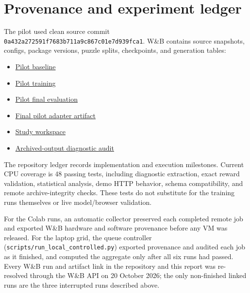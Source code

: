 \documentclass[11pt]{article}
\begin{document}
\section{Provenance and experiment ledger}
The pilot used clean source commit
\texttt{0a432a272591f7683b711a9c867c01e7d939fca1}. W\&B contains source snapshots,
configs, package versions, puzzle splits, checkpoints, and generation tables:
\begin{itemize}[nosep]
\item \href{https://wandb.ai/mohamedsobhi777/countdown-grpo/runs/qu1ovu2z}{Pilot baseline}
\item \href{https://wandb.ai/mohamedsobhi777/countdown-grpo/runs/uv3hjjih}{Pilot training}
\item \href{https://wandb.ai/mohamedsobhi777/countdown-grpo/runs/1qrixzrf}{Pilot final evaluation}
\item \href{https://wandb.ai/mohamedsobhi777/countdown-grpo/artifacts/model/uv3hjjih-adapter/v0}{Final pilot adapter artifact}
\item \href{https://wandb.ai/mohamedsobhi777/countdown-grpo/workspace}{Study workspace}
\item \href{https://wandb.ai/mohamedsobhi777/countdown-grpo/runs/jyyk55pq}{Archived-output diagnostic audit}
\end{itemize}
The repository ledger records implementation and execution milestones. Current
CPU coverage is 48 passing tests, including diagnostic extraction, exact reward
validation, statistical analysis, demo HTTP behavior, schema compatibility,
and remote archive-integrity checks. These tests do not substitute for the
training runs themselves or live model/browser validation.

For the Colab runs, an automatic collector preserved each completed remote job
and exported W\&B hardware and software provenance before any VM was released.
For the laptop grid, the queue controller
(\texttt{scripts/run\_local\_controlled.py}) exported provenance and audited
each job as it finished, and computed the aggregate only after all six runs had
passed. Every W\&B run and artifact link in the repository and this report was
re-resolved through the W\&B API on 20 October 2026; the only non-finished
linked runs are the three interrupted runs described above.
\end{document}
